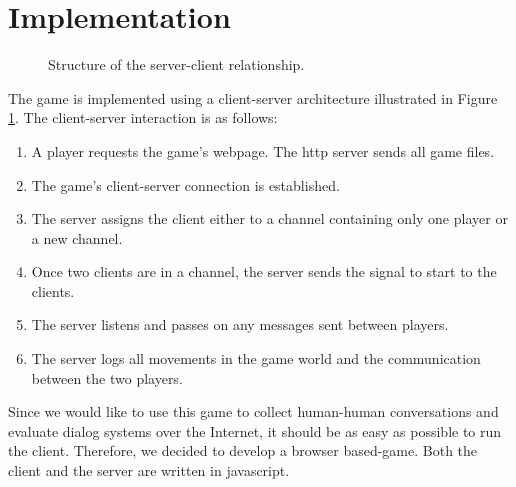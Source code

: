 \section{Implementation}



\begin{figure}
\caption{Structure of the server-client
  relationship.}
\label{fig:server-client}
\end{figure}

The game is implemented using a client-server architecture illustrated
in Figure \ref{fig:server-client}. The client-server interaction is as
follows:

\begin{enumerate}
\item A player requests the game's webpage. The http server sends all game files.
\item The game's client-server connection is established.
\item The server assigns the client either to a channel containing
  only one player or a new channel.
\item Once two clients are in a channel, the server sends the signal to start
  to the clients.
\item The server listens and passes on any messages sent between
  players.
\item The server logs all movements in the game world and the
  communication between the two players.
\end{enumerate}



Since we would like to use this game to collect human-human
conversations and evaluate dialog systems over the Internet, it should
be as easy as possible to run the client. Therefore, we decided to
develop a browser based-game. Both the client and the server are
written in javascript.

